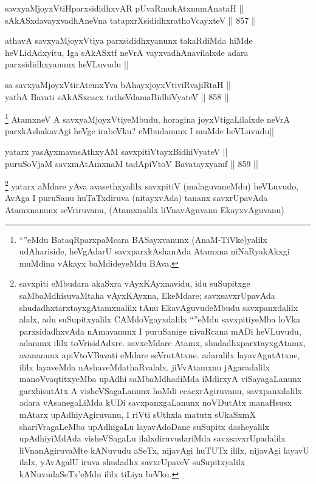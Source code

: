 \begin{shl}
savxyaMjoyxVtiHparxsididhxvAR pUvaRmukAtx\s numAnataH || \\
sAkASxdavayxvadhAneVna tatapxrXsididhxrathoVcayxteV ||  857 ||  
\end{shl}

\begin{artha}
athavA savxyaMjoyxVtiya parxsididhxyanunx takaRdiMda hiMde heVLidAdxyitu, Iga sAkASxtf neVrA vayxvadhAnavilalxde adara parxsididhxyanunx heVLuvudu ||
\end{artha}


\begin{shl}
sa savxyaMjoyxVtirAtemxYva bAhayxjoyxVtiviRvajiRtaH || \\
yathA Bavati sAkASxcacx tatheVdamaBidhiVyateV ||  858 ||  
\end{shl}

\begin{artha}
\footnote{``\stext''eMdu BataqRparxpaMcara BASayxvanunx (AnaM-TiVke)yalilx udAhariside, heVgAdarU savxparxkAshanAda Atamxna niNaRyakAkxgi muMdina vAkayx baMdideyeMdu BAva.}
AtamxneV A savxyaMjoyxVtiyeMbudu, horagina joyxVtigaLilalxde neVrA parxkAshakavAgi heVge irabeVku? eMbudanunx I muMde heVLuvudu||
\end{artha}


\begin{shl}
yatarx yasAyxmavasAthxyAM savxpitiVtayxBidhiVyateV || \\
puruSoV\s jaM savxmAtAmxnaM tadA\s piVtoV Bavatayxyamf ||  859 ||  
\end{shl}

\begin{artha}
\footnote{savxpiti eMbudara akaSxra vAyxKAyxnavidu, idu suSupitxge saMbaMdhisuvaMtaha vAyxKAyxna, EkeMdare; savxsavxrUpavAda shudadhxtarxtayxgAtamxnalilx tAnu EkavAguvudeMbudu savxpanxdalilx alalx, adu suSupitxyalilx CAMdoVgayxdalilx ``\stext''eMdu savxpitiyeMba loVka parxsidadhxvAda nAmavanunx I puruSanige nivaRcana mADi heVLuvudu, adanunx ililx toVrisidAdxre. savxeMdare Atamx, shudadhxparxtayxgAtamx, avananunx apiVtoVBavati eMdare seVrutAtxne. adaralilx layavAgutAtxne, ililx layaveMda nAshaveMdathaRvalalx, jiVvAtamxnu jAgaradalilx manoVvaqtitxyeMba upAdhi saMbaMdhadiMda iMdirxyA viSayagaLanunx garxhisutAtx A visheVSagaLanunx hoMdi ecacxrAgiruvanu, savxpanxdalilx adara vAsanegaLiMda kUDi savxpanxgaLanunx noVDutAtx manaHsusx mAtarx upAdhiyAgiruvanu, I riVti sUthxla matutx sUkaSxmX shariVragaLeMba upAdhigaLu layavAdoDane suSupitx dasheyalilx upAdhiyiMdAda visheVSagaLu ilalxdiruvudariMda savxsavxrUpadalilx liVnanAgiruvaMte kANuvudu aSeTx, nijavAgi huTUTx ililx, nijavAgi layavU ilalx, yAvAgalU iruva shudadhx savxrUpaveV suSupitxyalilx kANuvudaSeTx'eMdu ililx tiLiya beVku.}
yatarx aMdare yAva avasethxyalilx savxpitiV (malaguvaneMdu) heVLuvudo, AvAga I puruSanu huTaTxdiruva (nitayxvAda) tananx savxrUpavAda Atamxnanunx seVriruvanu, (Atamxnalilx liVnavAguvanu EkayxvAguvanu)
\end{artha}

